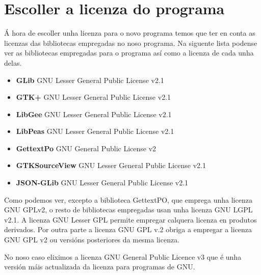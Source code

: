 \chapter{Escoller a licenza do programa}

Á hora de escoller unha licenza para o novo programa temos que ter en conta as licenzas das bibliotecas empregadas no noso programa. Na siguente lista podense ver as bibliotecas empregadas para o programa así como a licenza de cada unha delas.

\begin{itemize}
  \item \textbf{GLib} GNU Lesser General Public License v2.1
  \item \textbf{GTK+} GNU Lesser General Public License v2.1
  \item \textbf{LibGee}  GNU Lesser General Public License v2.1
  \item \textbf{LibPeas} GNU Lesser General Public License v2.1
  \item \textbf{GettextPo} GNU General Public License v2
  \item \textbf{GTKSourceView} GNU Lesser General Public License v2.1
  \item \textbf{JSON-GLib} GNU Lesser General Public License v2.1
\end{itemize}

Como podemos ver, excepto a biblioteca GettextPO, que emprega unha licenza GNU GPLv2, o resto de bibliotecas empregadas usan unha licenza GNU LGPL v2.1. A licenza GNU Lesser GPL permite empregar calquera licenza en produtos derivados. Por outra parte a licenza GNU GPL v.2 obriga a empregar a licenza GNU GPL v2 ou versións posteriores da mesma licenza.

No noso caso eliximos a licenza GNU General Public Licence v3 que é unha versión máis actualizada da licenza para programas de GNU.
